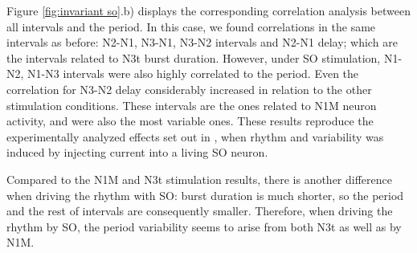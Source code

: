Figure \ref{fig:invariant so}.b) displays the corresponding correlation analysis between all intervals and the period. %
In this case, we found correlations in the same intervals as before: N2-N1, N3-N1, N3-N2 intervals and N2-N1 delay; which are the intervals related to N3t burst duration. However, under SO stimulation,  N1-N2, N1-N3 intervals were also highly correlated to the period. Even the correlation for N3-N2 delay considerably increased in relation to the other stimulation conditions. These intervals are the ones related to N1M neuron activity, and were also the most variable ones.  These results reproduce the experimentally analyzed effects set out in \parencite{Elliott1991}, when rhythm and variability was induced by injecting current into a living SO neuron.


Compared to the N1M and N3t stimulation results, there is another difference when driving the rhythm with SO: burst duration is much shorter, so the period and the rest of intervals are consequently smaller. Therefore, when driving the rhythm by SO, the period variability seems to arise from both N3t as well as by N1M. 


